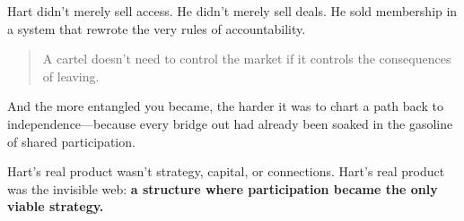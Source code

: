 \medskip

Hart didn’t merely sell access. He didn’t merely sell deals. He sold membership in a system that rewrote the very rules of accountability.

\begin{quote}
A cartel doesn’t need to control the market if it controls the consequences of leaving.
\end{quote}

And the more entangled you became, the harder it was to chart a path back to independence—because every bridge out had already been soaked in the gasoline of shared participation.

Hart’s real product wasn’t strategy, capital, or connections.  
Hart’s real product was the invisible web:  
\textbf{a structure where participation became the only viable strategy.}

